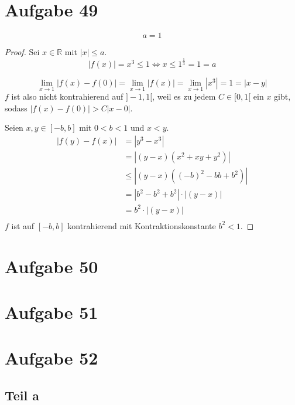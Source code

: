 \documentclass[10pt,a4paper]{article}
\begin{document}
\section*{Aufgabe 49}

\begin{equation}
a = 1
\end{equation}

\begin{proof}
Sei $x \in \mathbb{R}$ mit $|x| \le a$.
\begin{equation}
|f(x)| = x^{3} \le 1 \Leftrightarrow x \le 1^{\frac{1}{3}} = 1 = a
\end{equation}

\begin{equation}
\lim_{x \rightarrow 1} |f(x) - f(0)| = \lim_{x \rightarrow 1} |f(x)| = \lim_{x \rightarrow 1} |x^{3}| = 1 = |x - y|
\end{equation}
$f$ ist also nicht kontrahierend auf $]-1, 1[$, weil es zu jedem $C \in [0, 1[$ ein $x$ gibt, sodass $|f(x) - f(0)| > C|x - 0|$.

Seien $x, y \in [-b, b]$ mit $0 < b < 1$ und $x < y$.
\begin{align*}
|f(y) - f(x)| & = |y^{3} - x^{3}|\\
& = |(y - x)(x^{2} + xy + y^{2})|\\
& \le |(y - x)((-b)^{2} - bb + b^{2})|\\
& = |b^{2} - b^{2} + b^{2}| \cdot |(y - x)|\\
& = b^{2} \cdot |(y - x)|\\
\end{align*}
$f$ ist auf $[-b, b]$ kontrahierend mit Kontraktionskonstante $b^{2} < 1$.
\end{proof}

\section*{Aufgabe 50}

\section*{Aufgabe 51}

\section*{Aufgabe 52}

\subsection*{Teil a}
\end{document}
